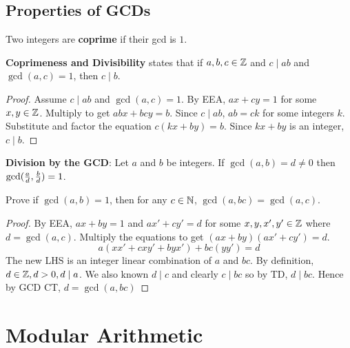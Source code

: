 \documentclass[english, 12pt]{article}
\begin{document}
\subsection{Properties of GCDs}
\begin{defn}
Two integers are \textbf{coprime} if their gcd is $1$.
\end{defn}
\begin{thrm}[CAD]
\textbf{Coprimeness and Divisibility} states that if $a,b,c \in {\mathbb{Z}}$ and $c \mid ab$ and $\gcd(a,c) = 1$, then $c \mid b$.

\begin{proof}
Assume $c \mid ab$ and $\gcd(a,c) = 1$. By EEA, $ax + cy = 1$ for some $x,y \in {\mathbb{Z}}$. Multiply to get $abx + bcy = b$. Since $c \mid ab$, $ab = ck$ for some integers $k$. Substitute and factor the equation $c(kx+by) = b$. Since $kx + by$ is an integer, $c \mid b$.
\end{proof}
\end{thrm}

\begin{thrm}[DB GCD]
\textbf{Division by the GCD}: Let $a$ and $b$ be integers. If $\gcd(a,b)=d\neq0$ then $\gcd(\frac{a}{d},\frac{b}{d})=1$.
\end{thrm}

\begin{exercise}
Prove if $\gcd(a,b) = 1$, then for any $c \in {\mathbb{N}}$, $\gcd(a,bc) = \gcd(a,c)$.

\begin{proof}
By EEA, $ax + by=1$ and $ax' + cy' = d$ for some $x,y,x',y' \in {\mathbb{Z}}$ where $d = \gcd(a,c)$. Multiply the equations to get $(ax+ by)(ax' + cy') =d$. 
\[ a(xx' + cxy' + byx') + bc(y y') = d \]
The new LHS is an integer linear combination of $a$ and $bc$. By definition, $ d \in {\mathbb{Z}}, d > 0, d \mid a$. We also known $d \mid c$ and clearly $c \mid bc$ so by TD, $d \mid bc$. Hence by GCD CT, $d = \gcd(a,bc)$
\end{proof}
\end{exercise}

\section{Modular Arithmetic}
\end{document}
